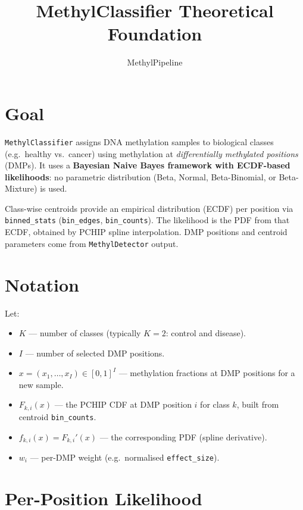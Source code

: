 \documentclass[11pt]{article}
\title{MethylClassifier Theoretical Foundation}
\author{MethylPipeline}
\date{}
\begin{document}
\maketitle
\tableofcontents
\newpage

\section{Goal}

\texttt{MethylClassifier} assigns DNA methylation samples to biological
classes (e.g.\ healthy vs.\ cancer) using methylation at \emph{differentially
methylated positions} (DMPs).  It uses a \textbf{Bayesian Naive Bayes
framework with ECDF-based likelihoods}: no parametric distribution (Beta,
Normal, Beta-Binomial, or Beta-Mixture) is used.

Class-wise centroids provide an empirical distribution (ECDF) per position
via \texttt{binned\_stats} (\texttt{bin\_edges}, \texttt{bin\_counts}).  The
likelihood is the PDF from that ECDF, obtained by PCHIP spline interpolation.
DMP positions and centroid parameters come from \texttt{MethylDetector}
output.

\section{Notation}

Let:
\begin{itemize}
  \item \(K\) --- number of classes (typically \(K=2\): control and disease).
  \item \(I\) --- number of selected DMP positions.
  \item \(x = (x_1,\ldots,x_I) \in [0,1]^I\) --- methylation fractions at
        DMP positions for a new sample.
  \item \(F_{k,i}(x)\) --- the PCHIP CDF at DMP position \(i\) for class
        \(k\), built from centroid \texttt{bin\_counts}.
  \item \(f_{k,i}(x) = F_{k,i}'(x)\) --- the corresponding PDF (spline
        derivative).
  \item \(w_i\) --- per-DMP weight (e.g.\ normalised \texttt{effect\_size}).
\end{itemize}

\section{Per-Position Likelihood}
\end{document}

